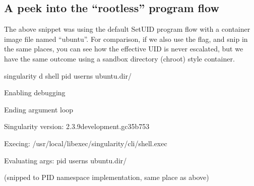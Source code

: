 \documentclass[letterpaper,10pt,english]{sphinxmanual}
\begin{document}
\subsection{A peek into the “rootless” program flow}
\label{\detokenize{security:a-peek-into-the-rootless-program-flow}}
The above snippet was using the default SetUID program flow with a
container image file named “ubuntu”. For comparison, if we also use the 
flag, and snip in the same places, you can see how the effective UID is
never escalated, but we have the same outcome using a sandbox directory
(chroot) style container.

%
\begin{sphinxVerbatim}[commandchars=\\\{\}]
\PYGZdl{} singularity \PYGZhy{}d shell \PYGZhy{}\PYGZhy{}pid \PYGZhy{}\PYGZhy{}userns ubuntu.dir/

Enabling debugging

Ending argument loop

Singularity version: 2.3.9\PYGZhy{}development.gc35b753

Exec\PYGZsq{}ing: /usr/local/libexec/singularity/cli/shell.exec

Evaluating args: \PYGZsq{}\PYGZhy{}\PYGZhy{}pid \PYGZhy{}\PYGZhy{}userns ubuntu.dir/\PYGZsq{}
\end{sphinxVerbatim}

(snipped to PID namespace implementation, same place as above)
\end{document}
